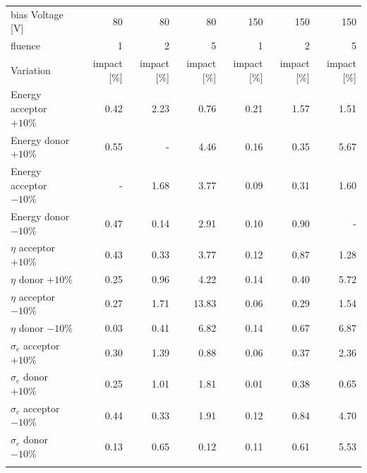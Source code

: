 \begin{table}[!htpb]
\begin{center}
\setlength{\tabcolsep}{0.0pc}
{\tiny
\begin{tabular*}{0.7\textwidth}{@{\extracolsep{\fill}}lrrrrrr}
\noalign{\smallskip}\hline\noalign{\smallskip}
bias Voltage [V]		& 80 & 80 & 80& 150 & 150 &150\\
fluence 					& 1 & 2 & 5 & 1 & 2 & 5\\
\noalign{\smallskip}\hline\noalign{\smallskip}

Variation 				& impact [\%] & impact [\%] & impact [\%] & impact [\%]& impact [\%] & impact [\%]\\
\noalign{\smallskip}\hline\noalign{\smallskip}

Energy acceptor $+10\%$   		& 0.42  	& 2.23  &0.76 & 0.21 & 1.57   &1.51  \\
Energy donor $+10\%$  			& 0.55  	&  -    & 4.46 & 0.16 & 0.35  &5.67\\
Energy acceptor $-10\%$  		& - 		&  1.68 & 3.77& 0.09  & 0.31  & 1.60 \\
Energy donor $-10\%$			& 0.47  	& 0.14  & 2.91 & 0.10  & 0.90 & -\\
\noalign{\smallskip}\hline\noalign{\smallskip}


$\eta$  acceptor $+10\%$  		& 0.43  	& 0.33   & 3.77   & 0.12  & 0.87  &1.28\\
$\eta$  donor $+10\%$  			& 0.25  	& 0.96   & 4.22   & 0.14  & 0.40  &5.72\\
$\eta$  acceptor $-10\%$  		& 0.27  	& 1.71   & 13.83 & 0.06  & 0.29   &1.54 \\
$\eta$  donor $-10\%$ 			& 0.03 	& 0.41   & 6.82   & 0.14  & 0.67   &6.87\\
\noalign{\smallskip}\hline\noalign{\smallskip}

$\sigma_e$ acceptor $+10\%$  	& 0.30		& 1.39   & 0.88 & 0.06 & 0.37  & 2.36\\
$\sigma_e$  donor $+10\%$  		& 0.25  	& 1.01   & 1.81 & 0.01 & 0.38   & 0.65 \\
$\sigma_e$  acceptor $-10\%$  	& 0.44  	& 0.33   &1.91 & 0.12  & 0.84   &4.70\\
$\sigma_e$  donor $-10\%$ 			& 0.13  	& 0.65   & 0.12 & 0.11 & 0.61  &5.53 \\

\noalign{\smallskip}\hline\noalign{\smallskip}


\end{tabular*}}
\end{center}
\end{table}
